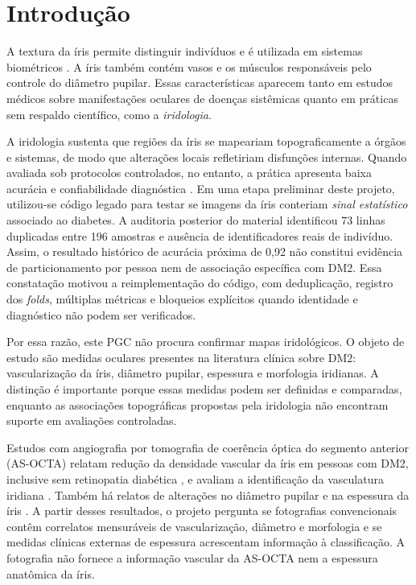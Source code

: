 \documentclass[12pt,a4paper]{article}
\begin{document}
\tableofcontents
\newpage

\hypersetup{pageanchor=true}
\setcounter{page}{1}

\onehalfspacing

\section{Introdução}

A textura da íris permite distinguir indivíduos e é utilizada em sistemas biométricos
\citep{Daugman2004}. A íris também contém vasos e os músculos responsáveis pelo controle do diâmetro
pupilar. Essas características aparecem tanto em estudos médicos sobre manifestações oculares de
doenças sistêmicas quanto em práticas sem respaldo científico, como a \emph{iridologia}.

A iridologia sustenta que regiões da íris se mapeariam topograficamente a órgãos e sistemas, de modo
que alterações locais refletiriam disfunções internas. Quando avaliada sob protocolos controlados, no
entanto, a prática apresenta baixa acurácia e confiabilidade diagnóstica \citep{Simon1979JAMA,
Ernst2000ArchOphthalmol}. Em uma etapa preliminar deste projeto, utilizou-se código legado para testar
se imagens da íris conteriam \emph{sinal estatístico} associado ao diabetes. A auditoria posterior do
material identificou 73 linhas duplicadas entre 196 amostras e ausência de identificadores reais de
indivíduo. Assim, o resultado histórico de acurácia próxima de 0,92 não constitui evidência de
particionamento por pessoa nem de associação específica com DM2. Essa constatação motivou a
reimplementação do código, com deduplicação, registro dos \textit{folds}, múltiplas
métricas e bloqueios explícitos quando identidade e diagnóstico não podem ser verificados.

Por essa razão, este PGC não procura confirmar mapas iridológicos. O objeto de estudo são medidas
oculares presentes na literatura clínica sobre DM2: vascularização da íris, diâmetro pupilar,
espessura e morfologia iridianas. A distinção é importante porque essas medidas podem ser definidas e
comparadas, enquanto as associações topográficas propostas pela iridologia não encontram suporte em
avaliações controladas.

Estudos com angiografia por tomografia de coerência óptica do segmento anterior (AS-OCTA) relatam
redução da densidade vascular da íris em pessoas com DM2, inclusive sem retinopatia diabética
\citep{Zhou2025SciRep}, e avaliam a identificação da vasculatura iridiana
\citep{Roberts2017CER,Zett2018Graefes}. Também há relatos de alterações no diâmetro pupilar e na
espessura da íris \citep{Cui2024BMC,Thakar2025Eye}. A partir desses resultados, o projeto pergunta se
fotografias convencionais contêm correlatos mensuráveis de vascularização, diâmetro e morfologia e se
medidas clínicas externas de espessura acrescentam informação à classificação. A fotografia não
fornece a informação vascular da AS-OCTA nem a espessura anatômica da íris.
\end{document}
